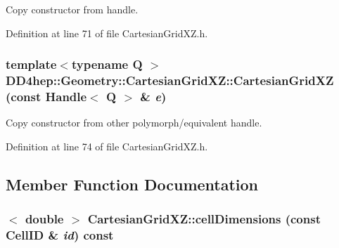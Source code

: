 Copy constructor from handle. 

Definition at line 71 of file CartesianGridXZ.h.\hypertarget{class_d_d4hep_1_1_geometry_1_1_cartesian_grid_x_z_a3d8a2e58894df58701a8929fafa4fccf}{
\subsubsection[{CartesianGridXZ}]{\setlength{\rightskip}{0pt plus 5cm}template$<$typename Q $>$ DD4hep::Geometry::CartesianGridXZ::CartesianGridXZ (const {\bf Handle}$<$ Q $>$ \& {\em e})}}
\label{class_d_d4hep_1_1_geometry_1_1_cartesian_grid_x_z_a3d8a2e58894df58701a8929fafa4fccf}


Copy constructor from other polymorph/equivalent handle. 

Definition at line 74 of file CartesianGridXZ.h.

\subsection{Member Function Documentation}
\hypertarget{class_d_d4hep_1_1_geometry_1_1_cartesian_grid_x_z_a5cfaa712b3469600040d85229159af8e}{
\subsubsection[{cellDimensions}]{$<$ double $>$ CartesianGridXZ::cellDimensions (const CellID \& {\em id}) const}}
\label{class_d_d4hep_1_1_geometry_1_1_cartesian_grid_x_z_a5cfaa712b3469600040d85229159af8e}


